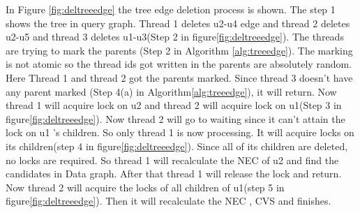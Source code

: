 \par In Figure \ref{fig:deltreeedge} the tree edge deletion process is shown. The step 1 shows the tree in query graph. Thread 1 deletes u2-u4 edge and thread 2 deletes u2-u5 and thread 3 deletes u1-u3(Step 2 in figure\ref{fig:deltreeedge}). The threads are trying to mark the parents (Step 2 in Algorithm \ref{alg:treeedge}). The marking is not atomic so the thread ids got written in the parents are absolutely random. Here Thread 1 and thread 2 got the parents marked. Since thread 3 doesn't have any parent marked (Step 4(a) in Algorithm\ref{alg:treeedge}), it will return. Now thread 1 will acquire lock on u2 and thread 2 will acquire lock on u1(Step 3 in figure\ref{fig:deltreeedge}). Now thread 2 will go to waiting since it can't attain the lock on u1 's children. So only thread 1 is now processing. It will acquire locks on its children(step 4 in figure\ref{fig:deltreeedge}). Since all of its children are deleted, no locks are required. So thread 1 will recalculate the NEC of u2 and find the candidates in Data graph. After that thread 1 will release the lock and return. Now thread 2 will acquire the locks of all children of u1(step 5 in figure\ref{fig:deltreeedge}). Then it will recalculate the NEC , CVS and finishes.
